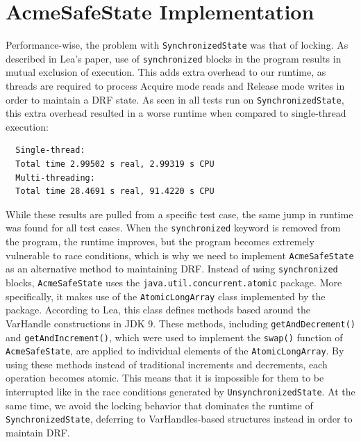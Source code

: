 \section{AcmeSafeState Implementation}

Performance-wise, the problem with \texttt{SynchronizedState} was that of locking.
As described in Lea's paper, use of \texttt{synchronized} blocks in the program
results in mutual exclusion of execution. This adds extra overhead to our runtime,
as threads are required to process Acquire mode reads and Release mode writes in
order to maintain a DRF state. As seen in all tests run on \texttt{SynchronizedState},
this extra overhead resulted in a worse runtime when compared to single-thread
execution:

\begin{verbatim}
  Single-thread:
  Total time 2.99502 s real, 2.99319 s CPU
  Multi-threading:
  Total time 28.4691 s real, 91.4220 s CPU
\end{verbatim}

While these results are pulled from a specific test case, the same jump in runtime was
found for all test cases. When the \texttt{synchronized} keyword is removed from
the program, the runtime improves, but the program becomes extremely vulnerable to
race conditions, which is why we need to implement \texttt{AcmeSafeState} as an
alternative method to maintaining DRF. Instead of using \texttt{synchronized} blocks,
\texttt{AcmeSafeState} uses the \texttt{java.util.concurrent.atomic} package. More
specifically, it makes use of the \texttt{AtomicLongArray} class implemented by the
package. According to Lea, this class defines methods based around the VarHandle 
constructions in JDK 9. These methods, including \texttt{getAndDecrement()} and 
\texttt{getAndIncrement()}, which were used to implement the \texttt{swap()} function
of \texttt{AcmeSafeState}, are applied to individual elements of the 
\texttt{AtomicLongArray}. By using these methods instead of traditional increments
and decrements, each operation becomes atomic. This means that it is impossible for them
 to be interrupted like in the race conditions generated by
\texttt{UnsynchronizedState}. At the same time, we avoid the locking behavior that
dominates the runtime of \texttt{SynchronizedState}, deferring to VarHandles-based
structures instead in order to maintain DRF. 

